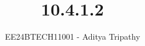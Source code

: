\documentclass[journal]{IEEEtran}
\begin{document}

\vspace{3cm}

\title{10.4.1.2}
\author{EE24BTECH11001 - Aditya Tripathy}
 \maketitle
{\let\newpage\relax\maketitle}

\renewcommand{\thefigure}{\theenumi}
\renewcommand{\thetable}{\theenumi}
\setlength{\intextsep}{10pt} %


\renewcommand{\thetable}{\theenumi}
\end{document}
